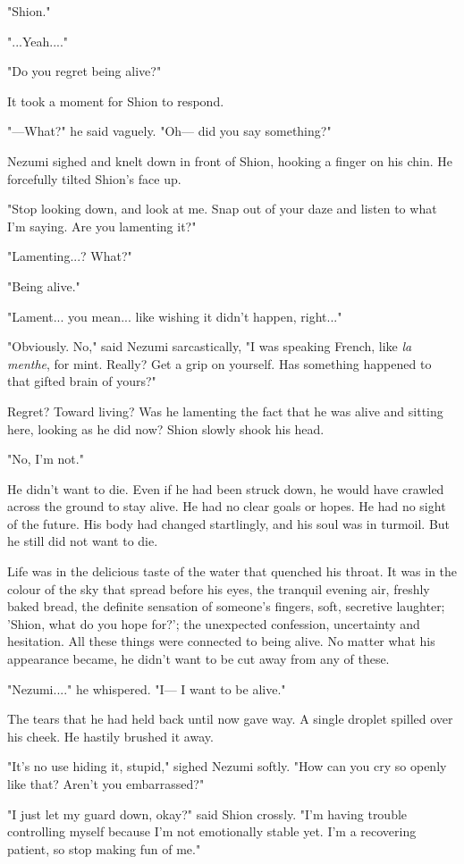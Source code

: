 "Shion."

"...Yeah...."

"Do you regret being alive?"

It took a moment for Shion to respond.

"---What?" he said vaguely. "Oh--- did you say something?"

Nezumi sighed and knelt down in front of Shion, hooking a finger on his
chin. He forcefully tilted Shion's face up.

"Stop looking down, and look at me. Snap out of your daze and listen to
what I'm saying. Are you lamenting it?"

"Lamenting...? What?"

"Being alive."

"Lament... you mean... like wishing it didn't happen, right..."

"Obviously. No," said Nezumi sarcastically, "I was speaking French, like
\emph{la menthe}, for mint. Really? Get a grip on yourself. Has
something happened to that gifted brain of yours?"

Regret? Toward living? Was he lamenting the fact that he was alive and
sitting here, looking as he did now? Shion slowly shook his head.

"No, I'm not."

He didn't want to die. Even if he had been struck down, he would have
crawled across the ground to stay alive. He had no clear goals or hopes.
He had no sight of the future. His body had changed startlingly, and his
soul was in turmoil. But he still did not want to die.

Life was in the delicious taste of the water that quenched his throat.
It was in the colour of the sky that spread before his eyes, the
tranquil evening air, freshly baked bread, the definite sensation of
someone's fingers, soft, secretive laughter; 'Shion, what do you hope
for?'; the unexpected confession, uncertainty and hesitation. All these
things were connected to being alive. No matter what his appearance
became, he didn't want to be cut away from any of these.

"Nezumi...." he whispered. "I--- I want to be alive."

The tears that he had held back until now gave way. A single droplet
spilled over his cheek. He hastily brushed it away.

"It's no use hiding it, stupid," sighed Nezumi softly. "How can you cry
so openly like that? Aren't you embarrassed?"

"I just let my guard down, okay?" said Shion crossly. "I'm having
trouble controlling myself because I'm not emotionally stable yet. I'm a
recovering patient, so stop making fun of me."

